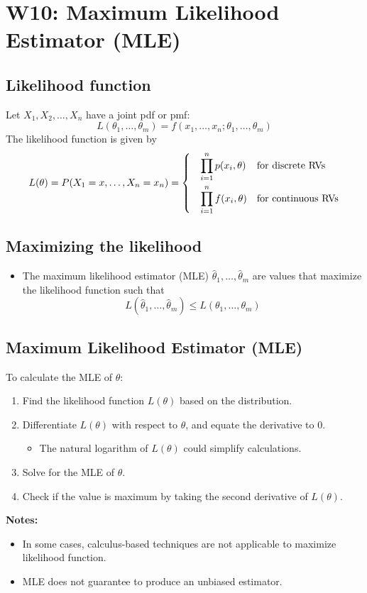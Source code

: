 \documentclass[a4paper]{article}
\begin{document}
\section{W10: Maximum Likelihood Estimator (MLE)}
\subsection{Likelihood function}
Let $X_{1}, X_{2}, \ldots , X_{n}$ have a joint pdf or pmf:
$$L(\theta_{1}, \ldots, \theta_{m}) = f(x_{1}, \ldots, x_{n}; \theta_{1}, \ldots, \theta_{m})$$
The likelihood function is given by
\begin{align*}
    L(\theta) = P(X_{1}=x, \ldots, X_{n}=x_{n}) = \begin{dcases}
    \quad \prod_{i=1}^{n} p(x_{i}, \theta) &\mbox{for discrete RVs}\\
    \quad \prod_{i=1}^{n} f(x_{i}, \theta) &\mbox{for continuous RVs}
    \end{dcases}
\end{align*}
\subsection{Maximizing the likelihood}
\begin{itemize}
    \item The maximum likelihood estimator (MLE) $\hat{\theta}_{1}, \ldots, \hat{\theta}_{m}$ are values that maximize the likelihood function such that
    $$L(\hat{\theta}_{1}, \ldots, \hat{\theta}_{m})\leq L(\theta_{1}, \ldots, \theta_{m})
    $$
\end{itemize}
\subsection{Maximum Likelihood Estimator (MLE)}
To calculate the MLE of $\theta$:
\begin{enumerate}
    \item Find the likelihood function $L(\theta)$ based on the distribution.
    \item Differentiate $L(\theta)$ with respect to $\theta$, and equate the derivative to 0.
    \begin{itemize}[label=$\circ$]
        \item The natural logarithm of $L(\theta)$ could simplify calculations.
    \end{itemize}
    \item Solve for the MLE of $\theta$.
    \item Check if the value is maximum by taking the second derivative of $L(\theta)$.
\end{enumerate}
\noindent\textbf{Notes:}
\begin{itemize}
    \item In some cases, calculus-based techniques are not applicable to maximize likelihood function.
    \item MLE does not guarantee to produce an unbiased estimator.
\end{itemize}
\newpage
\end{document}
